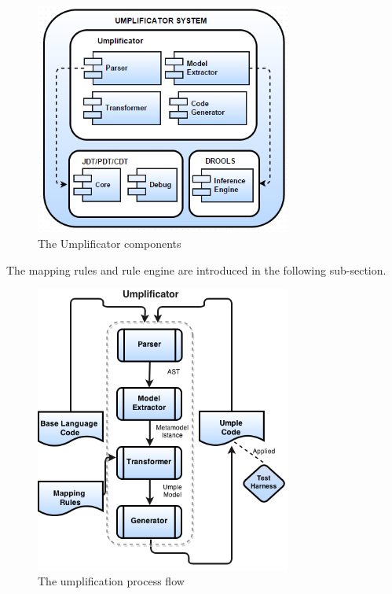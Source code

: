 \begin{figure}[h]
\centering
\includegraphics[width=0.75\textwidth]{Figures/UmplificatorComponents.png} 
\caption{The Umplificator components}
\label{fig:architecture}
\end{figure}

The mapping rules and rule engine are introduced in the following sub-section. 

\begin{figure}[h]
\centering
\includegraphics[width=0.75\textwidth]{Figures/Umplificator_ProcessFlow.png} 
\caption{The umplification process flow}
\label{fig:process_flow}
\end{figure}

